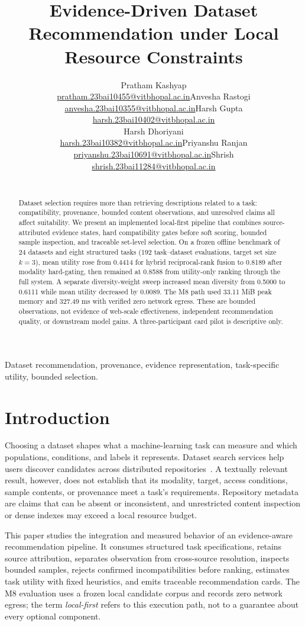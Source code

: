 \documentclass[conference]{IEEEtran}
\title{Evidence-Driven Dataset Recommendation under Local Resource Constraints}
\author{%
  \begin{tabular}{ccc}
    \parbox[t]{0.31\textwidth}{\centering Pratham Kashyap\\[-1pt]\footnotesize\url{pratham.23bai10455@vitbhopal.ac.in}} &
    \parbox[t]{0.31\textwidth}{\centering Anvesha Rastogi\\[-1pt]\footnotesize\url{anvesha.23bai10355@vitbhopal.ac.in}} &
    \parbox[t]{0.31\textwidth}{\centering Harsh Gupta\\[-1pt]\footnotesize\url{harsh.23bai10402@vitbhopal.ac.in}} \\
    \parbox[t]{0.31\textwidth}{\centering Harsh Dhoriyani\\[-1pt]\footnotesize\url{harsh.23bai10382@vitbhopal.ac.in}} &
    \parbox[t]{0.31\textwidth}{\centering Priyanshu Ranjan\\[-1pt]\footnotesize\url{priyanshu.23bai10691@vitbhopal.ac.in}} &
    \parbox[t]{0.31\textwidth}{\centering Shrish\\[-1pt]\footnotesize\url{shrish.23bai11284@vitbhopal.ac.in}}
  \end{tabular}\\[5pt]
  \IEEEauthorblockA{\textit{School of Computing Science and Artificial Intelligence (SCAI), VIT Bhopal University}\\
  Bhopal-Indore Highway, Kothrikalan, Sehore 466114, Madhya Pradesh, India}
}
\begin{document}
\maketitle

\begin{abstract}
Dataset selection requires more than retrieving descriptions related to a task: compatibility, provenance, bounded content observations, and unresolved claims all affect suitability. We present an implemented local-first pipeline that combines source-attributed evidence states, hard compatibility gates before soft scoring, bounded sample inspection, and traceable set-level selection. On a frozen offline benchmark of 24 datasets and eight structured tasks (192 task--dataset evaluations, target set size $k=3$), mean utility rose from 0.4414 for hybrid reciprocal-rank fusion to 0.8189 after modality hard-gating, then remained at 0.8588 from utility-only ranking through the full system. A separate diversity-weight sweep increased mean diversity from 0.5000 to 0.6111 while mean utility decreased by 0.0089. The M8 path used 33.11 MiB peak memory and 327.49 ms with verified zero network egress. These are bounded observations, not evidence of web-scale effectiveness, independent recommendation quality, or downstream model gains. A three-participant card pilot is descriptive only.
\end{abstract}

\begin{IEEEkeywords}
Dataset recommendation, provenance, evidence representation, task-specific utility, bounded selection.
\end{IEEEkeywords}

\section{Introduction}
Choosing a dataset shapes what a machine-learning task can measure and which populations, conditions, and labels it represents. Dataset search services help users discover candidates across distributed repositories~\cite{noy2019googledatasetsearch}. A textually relevant result, however, does not establish that its modality, target, access conditions, sample contents, or provenance meet a task's requirements. Repository metadata are claims that can be absent or inconsistent, and unrestricted content inspection or dense indexes may exceed a local resource budget.

This paper studies the integration and measured behavior of an evidence-aware recommendation pipeline. It consumes structured task specifications, retains source attribution, separates observation from cross-source resolution, inspects bounded samples, rejects confirmed incompatibilities before ranking, estimates task utility with fixed heuristics, and emits traceable recommendation cards. The M8 evaluation uses a frozen local candidate corpus and records zero network egress; the term \emph{local-first} refers to this execution path, not to a guarantee about every optional component.
\end{document}
